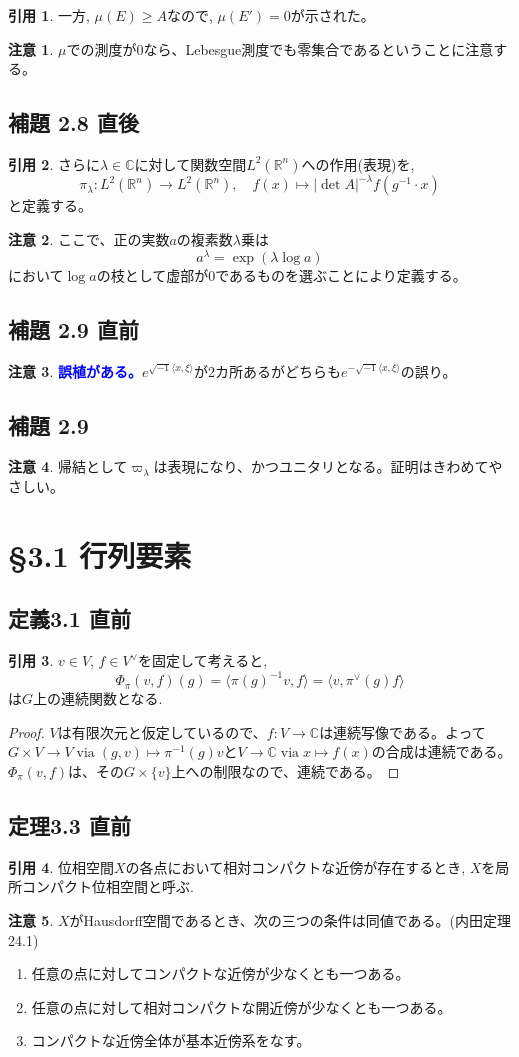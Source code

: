 \documentclass[12pt]{jsarticle}
\newcommand{\R}{\mathbb{R}}
\newcommand{\C}{\mathbb{C}}
\newcommand{\textblue}[1]{\textcolor{blue}{\textbf{#1}}}
\newcommand{\I}{\sqrt{-1}}%
\newcommand{\abs}[1]{\left \lvert #1 \right \rvert}%
\newcommand{\inprod}[2]{\langle #1 , #2 \rangle}%
\theoremstyle{definition}%
\newtheorem*{rem}{注意}
\newtheorem*{quo}{引用}%
\renewenvironment{leftbar}{%
  \renewcommand\FrameCommand{\vrule width 1pt \hspace{10pt}}%
  \MakeFramed {\advance\hsize-\width \FrameRestore}}%
 {\endMakeFramed}
\newcommand{\barquo}[1]{\begin{leftbar} \begin{quo}  #1 \end{quo} \end{leftbar}}
\newcommand{\bfsubsection}[1]{\subsection*{\textbf{#1}}}
\begin{document}
\barquo{
一方, $\mu(E) \geq A$なので, $\mu(E')=0$が示された。
}
\begin{rem}
  $\mu$での測度が0なら、Lebesgue測度でも零集合であるということに注意する。
\end{rem}


\bfsubsection{補題 2.8 直後}
\barquo{
さらに$\lambda \in \C$に対して関数空間$L^2(\R^n)$への作用(表現)を,
\[
\pi_{\lambda} \colon L^2(\R^n) \to L^2(\R^n), \quad f(x) \mapsto \abs{\det A}^{- \lambda} f(g^{-1} \cdot x)
\]
と定義する。
}
\begin{rem}
  ここで、正の実数$a$の複素数$\lambda$乗は
  \[
a^{\lambda} = \exp(\lambda \log a)
  \]
  において$\log a$の枝として虚部が0であるものを選ぶことにより定義する。
\end{rem}


\bfsubsection{補題 2.9 直前}
\begin{rem}
  \textblue{誤植がある。}$e^{\I \inprod{x}{\xi}}$が2カ所あるがどちらも$e^{- \I \inprod{x}{\xi}}$の誤り。
\end{rem}


\bfsubsection{補題 2.9}
\begin{rem}
帰結として$\varpi_{\lambda}$は表現になり、かつユニタリとなる。証明はきわめてやさしい。
\end{rem}


\section*{\S 3.1 行列要素}
\bfsubsection{定義3.1 直前}
\barquo{
$v \in V$, $f \in V^{\vee}$を固定して考えると,
\[
\Phi_{\pi}(v,f)(g) = \inprod{\pi(g)^{-1}v}{f} = \inprod{v}{\pi^{\vee}(g)f}
\]
は$G$上の連続関数となる.
}
\begin{proof}
  $V$は有限次元と仮定しているので、$f \colon V \to \C$は連続写像である。よって$G \times V \to V \; \text{via} \; (g,v) \mapsto \pi^{-1}(g)v$と$V \to \C \; \text{via} \; x \mapsto f(x)$の合成は連続である。$\Phi_{\pi}(v,f)$は、その$G \times \{ v\}$上への制限なので、連続である。
\end{proof}


\bfsubsection{定理3.3 直前}
\barquo{
位相空間$X$の各点において相対コンパクトな近傍が存在するとき, $X$を局所コンパクト位相空間と呼ぶ.
}
\begin{rem}
  $X$がHausdorff空間であるとき、次の三つの条件は同値である。(内田\cite{内田}定理24.1)
  \begin{enumerate}
    \item 任意の点に対してコンパクトな近傍が少なくとも一つある。
    \item 任意の点に対して相対コンパクトな開近傍が少なくとも一つある。
    \item コンパクトな近傍全体が基本近傍系をなす。
  \end{enumerate}
\end{rem}
\end{document}
